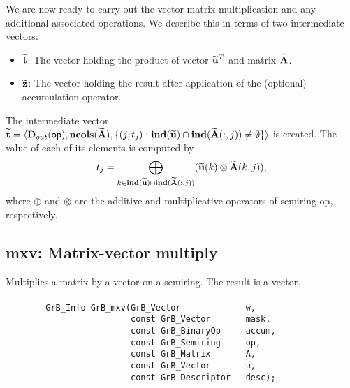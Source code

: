 We are now ready to carry out the vector-matrix multiplication and any additional 
associated operations.  We describe this in terms of two intermediate vectors:
\begin{itemize}
    \item ${\bf \widetilde{t}}$: The vector holding the product of vector
    ${\bf \widetilde{u}}^T$ and matrix ${\bf \widetilde{A}}$.
    \item ${\bf \widetilde{z}}$: The vector holding the result after 
    application of the (optional) accumulation operator.
\end{itemize}

The intermediate vector ${\bf \widetilde{t}} = \langle
\mbox{$\mathbf{D}_{out}$}({\sf op}), \bold{ncols}({\bf \widetilde{A}}),
\{(j,t_j) : \bold{ind}({\bf \widetilde{u}}) \cap
\bold{ind}({\bf \widetilde{A}}(:,j)) \neq \emptyset \} \rangle$
is created.  The value of each of its elements is computed by 
\[t_j = \bigoplus_{k \in \bold{ind}({\bf \widetilde{u}}) \cap
\bold{ind}({\bf \widetilde{A}}(:,j))} ({\bf \widetilde{u}}(k)
\otimes {\bf \widetilde{A}}(k,j)),\] where $\oplus$ and $\otimes$
are the additive and multiplicative operators of semiring {\sf op},
respectively.






\subsection{{\sf mxv}: Matrix-vector multiply}

Multiplies a matrix by a vector on a semiring. The result is a vector.

\paragraph{\syntax}

\begin{verbatim}
        GrB_Info GrB_mxv(GrB_Vector             w,
                         const GrB_Vector       mask,
                         const GrB_BinaryOp     accum,
                         const GrB_Semiring     op,
                         const GrB_Matrix       A,
                         const GrB_Vector       u,
                         const GrB_Descriptor   desc);
\end{verbatim}

